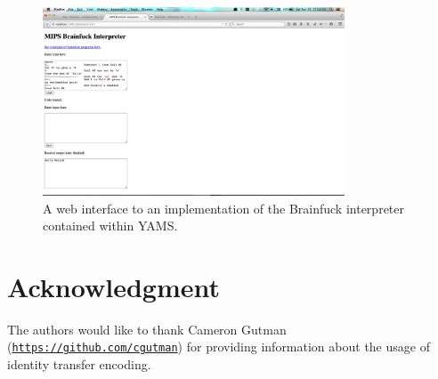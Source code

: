 \documentclass[journal,10pt]{IEEEtran}
\begin{document}
\begin{figure}[H]
\centering
\includegraphics[width=0.8\textwidth,natwidth=1440,natheight=900]{interactive_ajax}
\caption{A web interface to an implementation of the Brainfuck interpreter contained within YAMS.}
\label{fig:interactive_ajax}
\end{figure}

\twocolumn %

\section*{Acknowledgment}


The authors would like to thank Cameron Gutman
(\texttt{\url{https://github.com/cgutman}}) for providing information about the
usage of identity transfer encoding.



\nocite{*}

\end{document}
